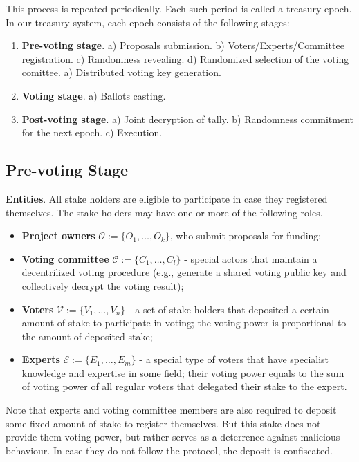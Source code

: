 This process is repeated periodically. Each such period is called a treasury epoch. In our treasury system, each epoch consists of the following stages:
\begin{enumerate}[leftmargin=5em, itemsep=0em]
    \item \textbf{Pre-voting stage}.
        \subitem a) Proposals submission.
        \subitem b) Voters/Experts/Committee registration.
        \subitem c) Randomness revealing.
        \subitem d) Randomized selection of the voting comittee.
        \subitem a) Distributed voting key generation.
    \item \textbf{Voting stage}.
        \subitem a) Ballots casting.
    \item \textbf{Post-voting stage}.
        \subitem a) Joint decryption of tally.
        \subitem b) Randomness commitment for the next epoch.
        \subitem c) Execution.
\end{enumerate}

\subsection{Pre-voting Stage}
\textbf{Entities}. All stake holders are eligible to participate in case they registered themselves. The stake holders may have one or more of the following roles.
\begin{itemize}[leftmargin=5em, itemsep=0em]
    \item \textbf{Project owners} $\mathcal{O}:=\{O_1,\ldots, O_k \}$, who submit proposals for funding;
    \item \textbf{Voting committee} $\mathcal{C}:=\{C_1,\ldots, C_l \}$ - special actors that maintain a decentrilized voting procedure (e.g., generate a shared voting public key and collectively decrypt the voting result);
    \item \textbf{Voters} $\mathcal{V}:=\{V_1,\ldots, V_n \}$ - a set of stake holders that deposited a certain amount of stake to participate in voting; the voting power is proportional to the amount of deposited stake;
    \item \textbf{Experts} $\mathcal{E}:=\{E_1,\ldots, E_m \}$ - a special type of voters that have specialist knowledge and expertise in some field; their voting power equals to the sum of voting power of all regular voters that delegated their stake to the expert.
\end{itemize}
Note that experts and voting committee members are also required to deposit some fixed amount of stake to register themselves. But this stake does not provide them voting power, but rather serves as a deterrence against malicious behaviour. In case they do not follow the protocol, the deposit is confiscated.
	
